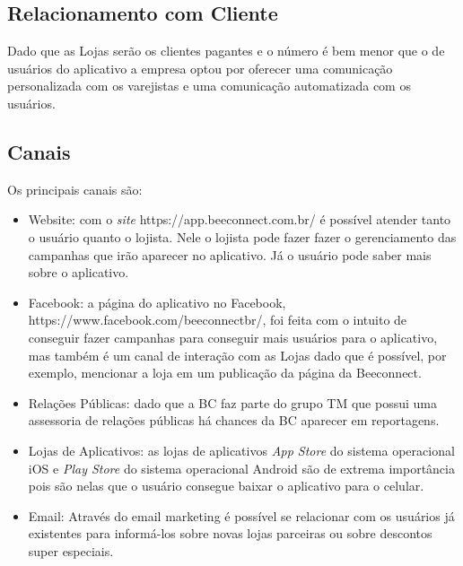 \subsection{Relacionamento com Cliente}
\label{cha:relacionamento_com_cliente}
Dado que as Lojas serão os clientes pagantes e o número é bem menor que o de usuários do aplicativo a empresa optou por oferecer uma comunicação personalizada com os varejistas e uma comunicação automatizada com os usuários. 

\subsection{Canais}
\label{cha:canais}
Os principais canais são:
\begin{itemize}
\item Website: com o \textit{site} https://app.beeconnect.com.br/ é possível atender tanto o usuário quanto o lojista. Nele o lojista pode fazer fazer o gerenciamento das campanhas que irão aparecer no aplicativo. Já o usuário pode saber mais sobre o aplicativo.
\item Facebook: a página do aplicativo no Facebook, https://www.facebook.com/beeconnectbr/, foi feita com o intuito de conseguir fazer campanhas para conseguir mais usuários para o aplicativo, mas também é um canal de interação com as Lojas dado que é possível, por exemplo, mencionar a loja em um publicação da página da Beeconnect.
\item Relações Públicas: dado que a BC faz parte do grupo TM que possui uma assessoria de relações públicas há chances da BC aparecer em reportagens.
\item Lojas de Aplicativos: as lojas de aplicativos \textit{App Store} do sistema operacional iOS e \textit{Play Store} do sistema operacional Android são de extrema importância pois são nelas que o usuário consegue baixar o aplicativo para o celular. 
\item Email: Através do email marketing é possível se relacionar com os usuários já existentes para informá-los sobre novas lojas parceiras ou sobre descontos super especiais.
\end{itemize}

